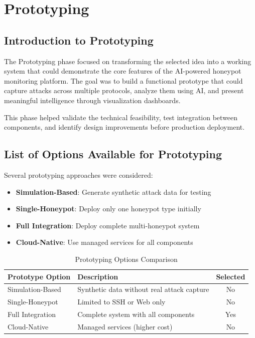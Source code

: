 \documentclass[12pt,a4paper]{report}
\begin{document}
\chapter{Prototyping}
\thispagestyle{fancy}

\section{Introduction to Prototyping}

The Prototyping phase focused on transforming the selected idea into a working system that could demonstrate the core features of the AI-powered honeypot monitoring platform. The goal was to build a functional prototype that could capture attacks across multiple protocols, analyze them using AI, and present meaningful intelligence through visualization dashboards.

This phase helped validate the technical feasibility, test integration between components, and identify design improvements before production deployment.

\section{List of Options Available for Prototyping}

Several prototyping approaches were considered:

\begin{itemize}
\item \textbf{Simulation-Based}: Generate synthetic attack data for testing
\item \textbf{Single-Honeypot}: Deploy only one honeypot type initially
\item \textbf{Full Integration}: Deploy complete multi-honeypot system
\item \textbf{Cloud-Native}: Use managed services for all components
\end{itemize}

\begin{table}[h]
\centering
\caption{Prototyping Options Comparison}
\label{tab:prototyping_options}
\begin{tabular}{|l|p{7cm}|c|}
\hline
\textbf{Prototype Option} & \textbf{Description} & \textbf{Selected} \\
\hline
Simulation-Based & Synthetic data without real attack capture & No \\
\hline
Single-Honeypot & Limited to SSH or Web only & No \\
\hline
Full Integration & Complete system with all components & Yes \\
\hline
Cloud-Native & Managed services (higher cost) & No \\
\hline
\end{tabular}
\end{table}
\end{document}
